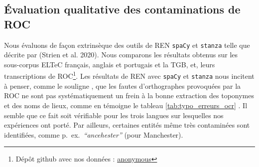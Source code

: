 

\subsection{Évaluation qualitative des contaminations de ROC}

Nous évaluons de façon extrinsèque des outils de REN \texttt{spaCy} et \texttt{stanza} telle que décrite par (Strien et al. 2020). Nous comparons les résultats obtenus sur les sous-corpus ELTeC français, anglais et portugais et la TGB, et, leurs transcriptions de ROC\footnote{Dépôt github avec nos données : \url{anonymous}}.
Les résultats de REN avec \texttt{spaCy} et \texttt{stanza} nous incitent à penser, comme le souligne \cite{DBLP:conf/gis/Koudoro-Parfait21}, que les fautes d'orthographes provoquées par la ROC ne sont pas systématiquement un frein à la bonne extraction des toponymes et des noms de lieux, comme en témoigne le tableau \ref{tab:typo_erreurs_ocr} . Il semble que ce fait soit vérifiable pour les trois langues sur lesquelles nos expériences ont porté. Par ailleurs, certaines entités même très contaminées sont identifiées, comme p.\ ex.\  \textit{``ancehester''} (pour \og{}Manchester\fg{}).

